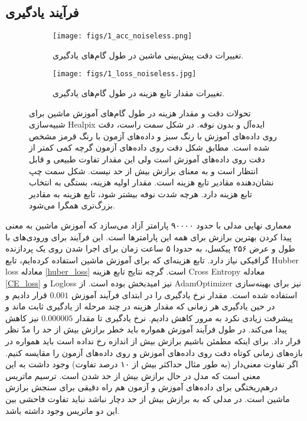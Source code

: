 \subsection{فرآیند یادگیری}
\begin{figure}[h!]
	\centering
	\begin{subfigure}{0.5\textwidth}
		\centering
		\texttt{[image: figs/1\_acc\_noiseless.png]}
		\caption{ تغییرات دقت پیش‌بینی‌ ماشین در طول گام‌های یادگیری.  }
	\end{subfigure}%
	\begin{subfigure}{0.5\textwidth}
		\centering
		\texttt{[image: figs/1\_loss\_noiseless.jpg]}
		\caption{ تغییرات مقدار تابع هزینه در طول گام‌های یادگیری. }
	\end{subfigure}
	
	\caption{  تحولات دقت  و مقدار هزینه در طول گام‌های آموزش ماشین 
		برای شبیه‌سازی Healpix ایده‌آل و بدون نوفه. در شکل سمت راست، دقت روی داده‌های آموزش با رنگ سبز و داده‌های آزمون با رنگ قرمز مشخص شده است. مطابق شکل دقت روی داده‌های آزمون گرچه کمی کمتر از  دقت روی داده‌های آموزش است ولی این مقدار تفاوت طبیعی و قابل انتظار است و به معنای برازش بیش از حد نیست. شکل سمت چپ نشان‌دهنده مقادیر تابع هزینه است. مقدار اولیه هزینه، بستگی به انتخاب تابع هزینه دارد. هرچه شدت نوفه بیشتر شود، تابع هزینه به مقادیر بزرگ‌تری همگرا می‌شود.}
	\label{fig:epoch}
\end{figure}
معماری نهایی مدلی با حدود ۹۰۰۰۰ پارامتر آزاد می‌سازد که آموزش ماشین به معنی پیدا کردن بهترین برازش برای همه این پارامتر‌ها است. این فرآیند برای ورودی‌های با طول و عرض ۲۵۶ پیکسل، به حدودا ۵ ساعت زمان برای اجرا شدن روی یک پردازنده گرافیکی
نیاز دارد.
تابع هزینه‌ای که برای آموزش ماشین استفاده کرده‌ایم، تابع Hubber loss معادله
\ref{huber_loss}
است. گرچه نتایج تابع هزینه Cross Entropy معادله
\ref{CE_loss}
 و Logloss 
 نیز امیدبخش بوده است. از AdamOptimizer نیز برای بهینه‌سازی استفاده شده است. مقدار نرخ یادگیری را در ابتدای فرآیند آموزش $0.001$ قرار دادیم و در حین یادگیری هر زمانی که مقدار هزینه در چند مرحله از یادگیری ثابت ماند و پیشرفت زیادی نکرد به مرور کاهش دادیم. نرخ یادگیری تا مقدار $0.000005$ نیز کاهش پیدا می‌کند.
 در طول فرآیند آموزش همواره باید خطر برازش بیش از حد را مدّ نظر قرار داد. برای اینکه مطمئن باشیم برازش بیش از اندازه رخ نداده است باید همواره در بازه‌های زمانی کوتاه دقت روی داده‌های آموزش و روی داده‌های آزمون را مقایسه کنیم. اگر تفاوت معنی‌دار (به طور مثال حداکثر بیش از ۱۰ درصد تفاوت) وجود داشت به این معنی است که مدل در حال برازش بیش از حد شدن است. ترسیم ماتریس درهم‌ریختگی برای داده‌های آموزش و آزمون هم راه دقیقی برای سنجش برازش ماشین است. در مدلی که به برازش بیش از حد دچار نباشد نباید تفاوت فاحشی بین این دو ماتریس وجود داشته باشد. 
